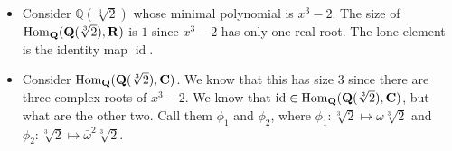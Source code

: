 \begin{example} \leavevmode
\begin{itemize}
\item Consider $\mathbb{Q}(\sqrt[3]{2})$ whose minimal polynomial is $x^3-2$. The size of $\operatorname{Hom}_\mathbf{Q}(\mathbf{Q}(\sqrt[3]{2}), \mathbf{R})$ is $1$ since $x^3-2$ has only one real root. The lone element is the identity map $\operatorname{id}$.
\item Consider $\operatorname{Hom}_\mathbf{Q}(\mathbf{Q}(\sqrt[3]{2}), \mathbf{C})$. We know that this has size $3$ since there are three complex roots of $x^3-2$. We know that $\operatorname{id} \in \operatorname{Hom}_\mathbf{Q}(\mathbf{Q}(\sqrt[3]{2}), \mathbf{C})$, but what are the other two. Call them $\phi_1$ and $\phi_2$, where $\phi_1\colon \sqrt[3]{2} \mapsto \omega\sqrt[3]{2}$ and $\phi_2\colon \sqrt[3]{2} \mapsto \bar{\omega}^2\sqrt[3]{2}$.
\end{itemize}
\end{example}
\pagebreak
